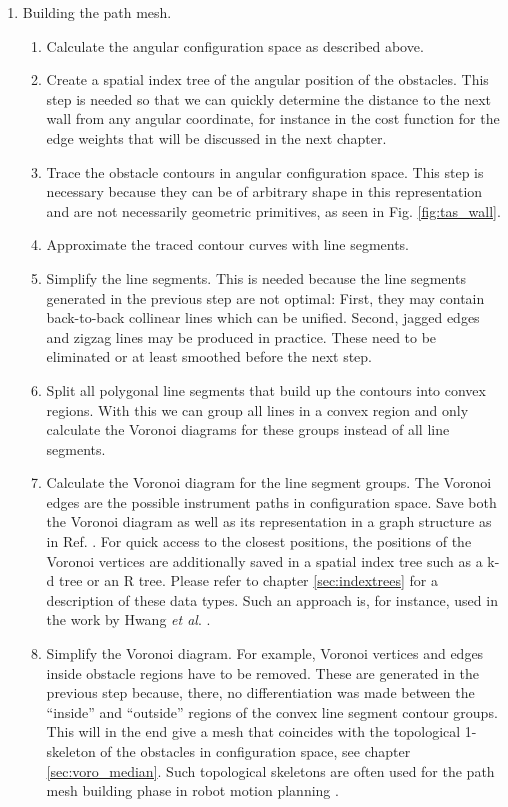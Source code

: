 \begin{enumerate}
	\item Building the path mesh.
	\begin{enumerate}
		\item Calculate the angular configuration space as described above.
		\item Create a spatial index tree of the angular position of the obstacles.
			This step is needed so that we can quickly determine the distance to
			the next wall from any angular coordinate, for instance in the cost
			function for the edge weights that will be discussed in the next chapter.
		\item Trace the obstacle contours in angular configuration space. 
			This step is necessary because they can be of arbitrary
			shape in this representation and are not necessarily geometric 
			primitives, as seen in Fig. \ref{fig:tas_wall}.
		\item Approximate the traced contour curves with line segments.
		\item Simplify the line segments. This is needed because the line 
			segments generated in the previous step are not optimal:
			First, they may contain back-to-back collinear lines which can be 
			unified. Second, jagged edges and zigzag lines may be
			produced in practice. These need to be eliminated or at least smoothed 
			before the next step.
		\item Split all polygonal line segments that build up the contours into 
			convex regions. With this we can group all lines in a convex region 
			and only calculate the Voronoi diagrams for these groups instead of 
			all line segments.
		\item Calculate the Voronoi diagram for the line segment groups. 
			The Voronoi edges are the possible instrument paths in configuration 
			space. Save both the Voronoi diagram as well as its representation 
			in a graph structure as in Ref. \cite[p. 163]{Berg2008}.
			For quick access to the closest positions, the positions of the
			Voronoi vertices are additionally saved in a spatial index tree such as a 
			k-d tree or an R tree.
			Please refer to chapter \ref{sec:indextrees} for a description of these data types.
			Such an approach is, for instance, used in the work by 
			Hwang \textit{et al}. \cite{Hwang2003}.
		\item Simplify the Voronoi diagram. For example, Voronoi vertices and 
			edges inside obstacle regions have to be removed.
			These are generated in the previous step because, there, no 
			differentiation was made between the ``inside'' and ``outside'' 
			regions of the convex line segment contour groups.
			This will in the end give a mesh that coincides with the
			topological 1-skeleton of the obstacles in configuration space, 
			see chapter \ref{sec:voro_median}.
			Such topological skeletons are often used for the path mesh building 
			phase in robot motion planning \cite{Choset2010_ch5}.
	\end{enumerate}


\end{enumerate}
